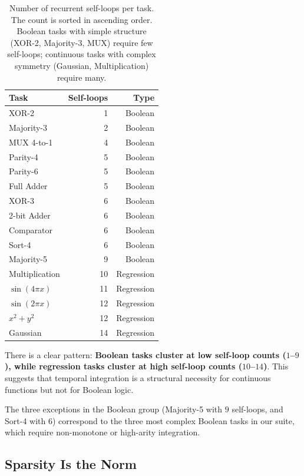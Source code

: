 \begin{table}[h]
  \centering
  \small
  \caption{Number of recurrent self-loops per task. The count is
    sorted in ascending order. Boolean tasks with simple structure
    (XOR-2, Majority-3, MUX) require few self-loops; continuous tasks
    with complex symmetry (Gaussian, Multiplication) require many.}
  \label{tab:recurrence}
  \begin{tabular}{lrr}
    \toprule
    \textbf{Task} & \textbf{Self-loops} & \textbf{Type} \\
    \midrule
    XOR-2       &  1 & Boolean \\
    Majority-3  &  2 & Boolean \\
    MUX 4-to-1  &  4 & Boolean \\
    Parity-4    &  5 & Boolean \\
    Parity-6    &  5 & Boolean \\
    Full Adder  &  5 & Boolean \\
    XOR-3       &  6 & Boolean \\
    2-bit Adder &  6 & Boolean \\
    Comparator  &  6 & Boolean \\
    Sort-4      &  6 & Boolean \\
    Majority-5  &  9 & Boolean \\
    \midrule
    Multiplication & 10 & Regression \\
    $\sin(4\pi x)$ & 11 & Regression \\
    $\sin(2\pi x)$ & 12 & Regression \\
    $x^2 + y^2$    & 12 & Regression \\
    Gaussian       & 14 & Regression \\
    \bottomrule
  \end{tabular}
\end{table}

There is a clear pattern: \textbf{Boolean tasks cluster at low
self-loop counts ($1$--$9$), while regression tasks cluster at high
self-loop counts ($10$--$14$)}. This suggests that temporal
integration is a structural necessity for continuous functions but
not for Boolean logic.

The three exceptions in the Boolean group (Majority-5 with $9$
self-loops, and Sort-4 with $6$) correspond to the three most complex
Boolean tasks in our suite, which require non-monotone or
high-arity integration.

\subsection{Sparsity Is the Norm}
\label{sec:results-sparsity}

